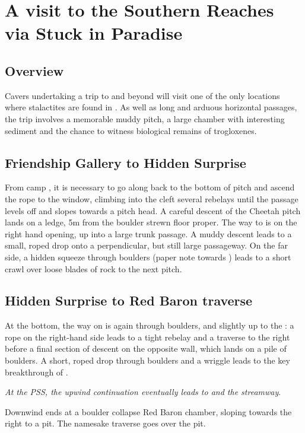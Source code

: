 \section{A visit to the Southern Reaches via Stuck in Paradise}

\subsection{Overview} 
Cavers undertaking a trip to  and beyond will visit one of the only locations where stalactites are found in . As well as long and arduous horizontal passages, the trip involves a memorable muddy pitch, a large chamber with interesting sediment and the chance to witness biological remains of trogloxenes.

\subsection{Friendship Gallery to Hidden Surprise}
From camp , it is necessary to go along  back to the bottom of  pitch and ascend the rope to the  window, climbing into the cleft several rebelays until the passage levels off and slopes towards a pitch head. A careful descent of the Cheetah pitch lands on a ledge, 5m from the boulder strewn floor proper. The way to  is on the right hand opening, up into a large trunk passage. A muddy descent leads to a small, roped drop onto a perpendicular, but still large passageway. On the far side, a hidden squeeze through boulders (paper note towards ) leads to a short crawl over loose blades of rock to the next pitch.
\subsection{Hidden Surprise to Red Baron traverse}
At the bottom, the way on is again through boulders, and slightly up to the : a rope on the right-hand side leads to a tight rebelay and a traverse to the right before a final section of descent on the opposite wall, which lands on a pile of boulders. A short, roped drop through boulders and a wriggle leads to the key breakthrough of . 

\textit{At the PSS, the upwind continuation eventually leads to  and the  streamway}. 

Downwind ends at a boulder collapse  Red Baron chamber, sloping towards the right to a pit. The namesake traverse goes over the pit.

